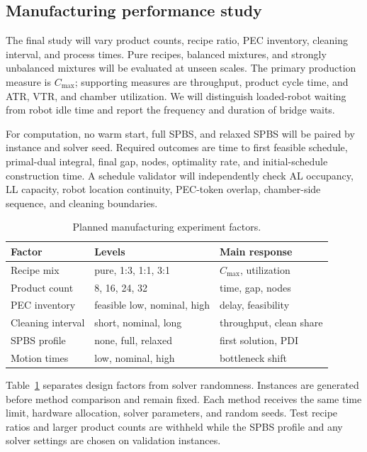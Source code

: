\documentclass[5p,times,procedia]{elsarticle}
\begin{document}
\subsection{Manufacturing performance study}

The final study will vary product counts, recipe ratio, PEC inventory, cleaning interval, and process times. Pure recipes, balanced mixtures, and strongly unbalanced mixtures will be evaluated at unseen scales. The primary production measure is $C_{\max}$; supporting measures are throughput, product cycle time, and ATR, VTR, and chamber utilization. We will distinguish loaded-robot waiting from robot idle time and report the frequency and duration of bridge waits.

For computation, no warm start, full SPBS, and relaxed SPBS will be paired by instance and solver seed. Required outcomes are time to first feasible schedule, primal-dual integral, final gap, nodes, optimality rate, and initial-schedule construction time. A schedule validator will independently check AL occupancy, LL capacity, robot location continuity, PEC-token overlap, chamber-side sequence, and cleaning boundaries.

\begin{table}[t]
\caption{Planned manufacturing experiment factors.}
\label{tab:doe}
\centering
\begin{tabular}{lll}
\toprule
Factor & Levels & Main response\\
\midrule
Recipe mix & pure, 1:3, 1:1, 3:1 & $C_{\max}$, utilization\\
Product count & 8, 16, 24, 32 & time, gap, nodes\\
PEC inventory & feasible low, nominal, high & delay, feasibility\\
Cleaning interval & short, nominal, long & throughput, clean share\\
SPBS profile & none, full, relaxed & first solution, PDI\\
Motion times & low, nominal, high & bottleneck shift\\
\bottomrule
\end{tabular}
\end{table}

Table~\ref{tab:doe} separates design factors from solver randomness. Instances are generated before method comparison and remain fixed. Each method receives the same time limit, hardware allocation, solver parameters, and random seeds. Test recipe ratios and larger product counts are withheld while the SPBS profile and any solver settings are chosen on validation instances.
\end{document}
